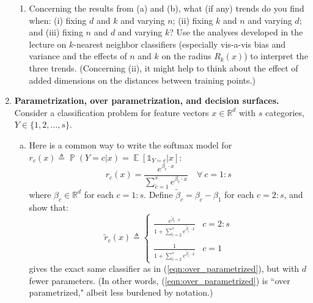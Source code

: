 \documentclass[11pt]{report}
\DeclareMathOperator{\Prob}{\mathbb{P}}
\DeclareMathOperator{\Exp}{\mathbb{E}}
\newcommand{\ind}{{\mathds{1}}}
\begin{document}
\begin{enumerate}[1.]
\begin{enumerate}
		      \item Concerning the results from (a) and (b), what (if any) trends do you find when: (i) fixing $d$ and $k$ and varying $n$; (ii) fixing $k$ and $n$ and varying $d$; and (iii) fixing $n$ and $d$ and varying $k$? Use the analyses developed in the lecture on $k$-nearest neighbor classifiers (especially vis-a-vis bias and variance and the effects of $n$ and $k$ on the radius $R_k(x)$) to interpret the three trends. (Concerning (ii), it might help to think about the effect of added dimensions on the distances between training points.)

	      \end{enumerate}

	      \pagebreak



	\item {\bf Parametrization, over parametrization, and decision surfaces.}
	      Consider a classification problem for feature vectors $x\in\mathds{R}^d$ with $s$ categories, $Y\in\{1,2,\ldots,s\}$.
	      \begin{enumerate}[(a)]

		      \item Here is a common way to write the softmax model for $r_c(x) \triangleq \Prob(Y=c | x) = \Exp[\ind_{Y=c} | x]$:
		            \begin{equation}
			            \label{eqn:over_parametrized}
			            r_c(x) = \frac{e^{\beta_c\cdot x}}{\sum_{\tilde{c}=1}^s e^{\beta_{\tilde{c}}\cdot x}} \quad \forall\ c=1:s
		            \end{equation}
		            where $\beta_c\in\mathds{R}^d$ for each $c=1:s$.
		            Define $\tilde{\beta}_c = \beta_c-\beta_1$ for each $c=2:s$, and show that: %
		            \[
			            \tilde{r}_c(x) \triangleq \begin{cases}  \frac{e^{\tilde{\beta}_c \cdot x}}{1+\sum_{\tilde{c}=2}^s e^{\tilde{\beta}_{\tilde{c}}\cdot x}} &
               c=2:s                                                                                             \\  \\
               \frac{1}{1+\sum_{\tilde{c}=2}^s e^{\tilde{\beta}_{\tilde{c}}\cdot x}}                           &
               c=1
			            \end{cases}
		            \]
		            gives the exact same classifier as in (\ref{eqn:over_parametrized}), but with $d$ fewer parameters. (In other words, (\ref{eqn:over_parametrized}) is ``over parametrized," albeit less burdened by notation.)



\end{enumerate}
\end{enumerate}
\end{document}
